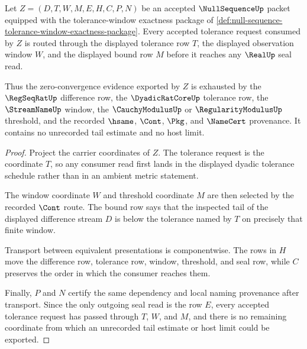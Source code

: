 \begin{theorem}
\label{thm:null-sequence-window-threshold-exactness}
Let $Z=(D,T,W,M,E,H,C,P,N)$ be an accepted $\NullSequenceUp$ packet equipped with the tolerance-window exactness package of \autoref{def:null-sequence-tolerance-window-exactness-package}. Every accepted tolerance request consumed by $Z$ is routed through the displayed tolerance row $T$, the displayed observation window $W$, and the displayed bound row $M$ before it reaches any $\RealUp$ seal read.

Thus the zero-convergence evidence exported by $Z$ is exhausted by the $\RegSeqRatUp$ difference row, the $\DyadicRatCoreUp$ tolerance row, the $\StreamNameUp$ window, the $\CauchyModulusUp$ or $\RegularityModulusUp$ threshold, and the recorded $\hsame$, $\Cont$, $\Pkg$, and $\NameCert$ provenance. It contains no unrecorded tail estimate and no host limit.
\end{theorem}
\begin{proof}
Project the carrier coordinates of $Z$. The tolerance request is the coordinate $T$, so any consumer read first lands in the displayed dyadic tolerance schedule rather than in an ambient metric statement.

The window coordinate $W$ and threshold coordinate $M$ are then selected by the recorded $\Cont$ route. The bound row says that the inspected tail of the displayed difference stream $D$ is below the tolerance named by $T$ on precisely that finite window.

Transport between equivalent presentations is componentwise. The rows in $H$ move the difference row, tolerance row, window, threshold, and seal row, while $C$ preserves the order in which the consumer reaches them.

Finally, $P$ and $N$ certify the same dependency and local naming provenance after transport. Since the only outgoing seal read is the row $E$, every accepted tolerance request has passed through $T$, $W$, and $M$, and there is no remaining coordinate from which an unrecorded tail estimate or host limit could be exported.
\end{proof}


